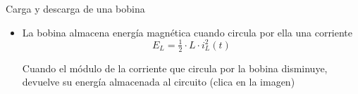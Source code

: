 \documentclass[aspectratio=169, usenames,svgnames,dvipsnames]{beamer}
\begin{document}

\begin{frame}{Carga y descarga de una bobina}  

\vspace{2mm}
    \begin{itemize}
        \item La bobina \alert{almacena energía magnética} cuando circula por ella una corriente
        \[
            E_L = \tfrac{1}{2}\cdot L \cdot i_L^2(t)
        \]
        
        Cuando el módulo de la corriente que circula por la bobina disminuye, \alert{devuelve su energía almacenada} al circuito \hspace{15mm}(\alert{clica en la imagen})        
    \end{itemize}

    \begin{center}
    \end{center}
\end{frame}

\end{document}

